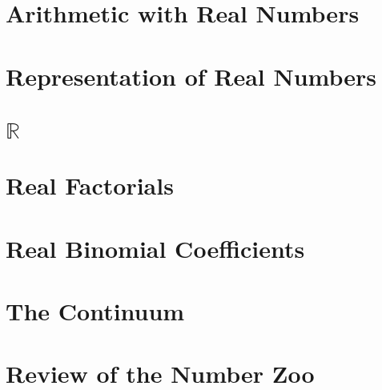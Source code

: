 \documentclass[tikz]{scrreprt}
\begin{document}
\section{Arithmetic with Real Numbers}
\section{Representation of Real Numbers} %
\section{$\mathbb{R}$}
\section{Real Factorials}
\section{Real Binomial Coefficients}
\section{The Continuum}
\section{Review of the Number Zoo}
\end{document}
